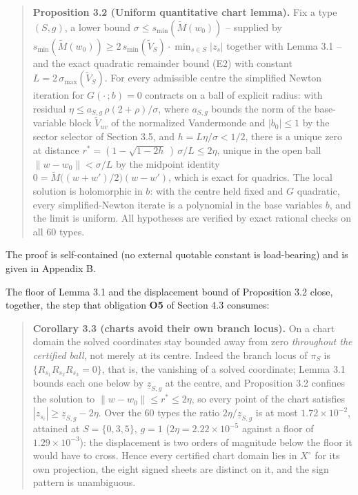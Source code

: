 \begin{quote}
\textbf{Proposition 3.2 (Uniform quantitative chart lemma).} Fix a type \((S, g)\), a lower bound \(\sigma \le s_{\min}(\tilde M(w_0))\) -- supplied by \(s_{\min}(\tilde M(w_0)) \ge 2\, s_{\min}(\tilde V_S) \cdot
\min_{s \in S} |z_s|\) together with Lemma 3.1 -- and the exact quadratic remainder bound (E2) with constant \(L = 2\,\sigma_{\max}(\tilde V_S)\). For every admissible centre the simplified Newton iteration for \(G(\cdot\,; b) = 0\) contracts on a ball of explicit radius: with residual \(\eta \le a_{S,g}\,\rho(2 + \rho)/\sigma\), where \(a_{S,g}\) bounds the norm of the base-variable block \(\tilde V_{uv}\) of the normalized Vandermonde and \(|b_0| \le 1\) by the sector selector of Section 3.5, and \(h = L\eta/\sigma < 1/2\), there is a unique zero at distance \(r^* = (1 - \sqrt{1 - 2h}\,)\,\sigma / L \le 2\eta\), unique in the open ball \(\lVert w - w_0 \rVert < \sigma/L\) by the midpoint identity \(0 = \tilde M\big((w + w')/2\big)(w - w')\), which is exact for quadrics. The local solution is holomorphic in \(b\): with the centre held fixed and \(G\) quadratic, every simplified-Newton iterate is a polynomial in the base variables \(b\), and the limit is uniform. All hypotheses are verified by exact rational checks on all 60 types.
\end{quote}

The proof is self-contained (no external quotable constant is load-bearing) and is given in Appendix B.

The floor of Lemma 3.1 and the displacement bound of Proposition 3.2 close, together, the step that obligation \textbf{O5} of Section 4.3 consumes:

\begin{quote}
\textbf{Corollary 3.3 (charts avoid their own branch locus).} On a chart domain the solved coordinates stay bounded away from zero \emph{throughout the certified ball}, not merely at its centre. Indeed the branch locus of \(\pi_S\) is \(\{R_{s_1} R_{s_2} R_{s_3} = 0\}\), that is, the vanishing of a solved coordinate; Lemma 3.1 bounds each one below by \(\underline{z}_{S,g}\) at the centre, and Proposition 3.2 confines the solution to \(\lVert w - w_0 \rVert \le r^* \le 2\eta\), so every point of the chart satisfies \(|z_{s_i}| \ge \underline{z}_{S,g} - 2\eta\). Over the \(60\) types the ratio \(2\eta / \underline{z}_{S,g}\) is at most \(1.72 \times 10^{-2}\), attained at \(S = \{0,3,5\}\), \(g = 1\) (\(2\eta = 2.22 \times 10^{-5}\) against a floor of \(1.29 \times 10^{-3}\)): the displacement is two orders of magnitude below the floor it would have to cross. Hence every certified chart domain lies in \(X^\circ\) for its own projection, the eight signed sheets are distinct on it, and the sign pattern is unambiguous.
\end{quote}

